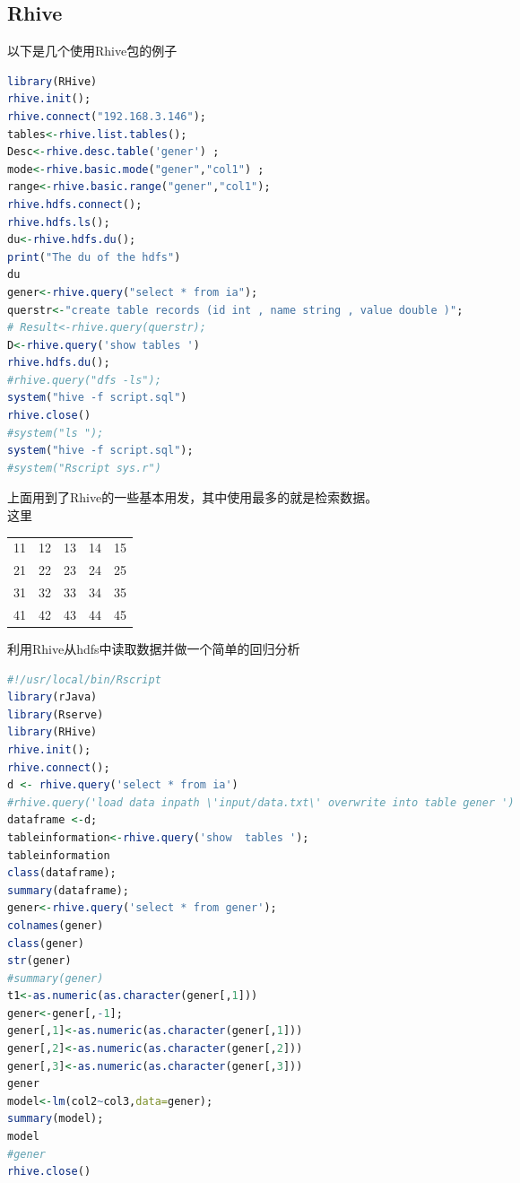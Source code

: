 \documentclass[12pt]{article}
\begin{document}
\begin{CJK*}{UTF8}{gbsn}
\section{Rhive}
以下是几个使用Rhive包的例子
\begin{lstlisting}[language=R]
library(RHive)
rhive.init();
rhive.connect("192.168.3.146");
tables<-rhive.list.tables();
Desc<-rhive.desc.table('gener') ;
mode<-rhive.basic.mode("gener","col1") ;
range<-rhive.basic.range("gener","col1");
rhive.hdfs.connect();
rhive.hdfs.ls();
du<-rhive.hdfs.du();
print("The du of the hdfs")
du
gener<-rhive.query("select * from ia");
querstr<-"create table records (id int , name string , value double )";
# Result<-rhive.query(querstr);
D<-rhive.query('show tables ')
rhive.hdfs.du();
#rhive.query("dfs -ls");
system("hive -f script.sql")
rhive.close()
#system("ls ");
system("hive -f script.sql");
#system("Rscript sys.r")
\end{lstlisting}
上面用到了Rhive的一些基本用发，其中使用最多的就是检索数据。\\
这里\begin{tabular}{lllll}
	11 & 12 & 13 & 14 & 15\\
	21 & 22 & 23 & 24 & 25\\
	31 & 32 & 33 & 34 & 35\\
	41 & 42 & 43 & 44 & 45\\
\end{tabular}
利用Rhive从hdfs中读取数据并做一个简单的回归分析
\begin{lstlisting}[language=R]
#!/usr/local/bin/Rscript
library(rJava)
library(Rserve)
library(RHive)
rhive.init();
rhive.connect();
d <- rhive.query('select * from ia')
#rhive.query('load data inpath \'input/data.txt\' overwrite into table gener ')
dataframe <-d;
tableinformation<-rhive.query('show  tables ');
tableinformation
class(dataframe);
summary(dataframe);
gener<-rhive.query('select * from gener');
colnames(gener)
class(gener)
str(gener)
#summary(gener)
t1<-as.numeric(as.character(gener[,1]))
gener<-gener[,-1];
gener[,1]<-as.numeric(as.character(gener[,1]))
gener[,2]<-as.numeric(as.character(gener[,2]))
gener[,3]<-as.numeric(as.character(gener[,3]))
gener
model<-lm(col2~col3,data=gener);
summary(model);
model
#gener
rhive.close()

\end{lstlisting}

\end{CJK*}
\end{document}
